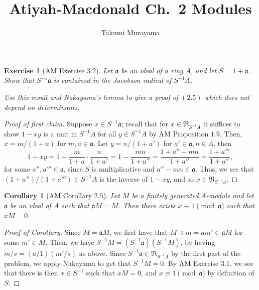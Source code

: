 \documentclass[12pt,letterpaper]{article}
\title{Atiyah-Macdonald Ch.~2 Modules}
\author{Takumi Murayama}
\newtheorem{problem}{Exercise}[section]
\newtheorem{corollary}{Corollary}
\theoremstyle{definition}
\theoremstyle{remark}
\numberwithin{figure}{problem}
\numberwithin{equation}{section}
\begin{document}
\maketitle
\setcounter{section}{3}
\begin{problem}[AM Exercise 3.2]
  Let $\mathfrak{a}$ be an ideal of a ring $A$, and let $S = 1 + \mathfrak{a}$. Show that $S^{-1}\mathfrak{a}$ is contained in the Jacobson radical of $S^{-1}A$.
  \par Use this result and Nakayama's lemma to give a proof of $(2.5)$ which does not depend on determinants.
\end{problem}
\begin{proof}[Proof of first claim]
  Suppose $x \in S^{-1}\mathfrak{a}$; recall that for $x \in \mathfrak{R}_{S^{-1}A}$ it suffices to show $1-xy$ is a unit in $S^{-1}A$ for all $y \in S^{-1}A$ by AM Proposition $1.9$. Then, $x = m/(1+a)$ for $m,a \in \mathfrak{a}$. Let $y = n/(1+a')$ for $a' \in \mathfrak{a},n \in A$, then
  \begin{equation*}
    1 - xy = 1 - \frac{m}{1+a} \cdot \frac{n}{1+a'} = 1 - \frac{mn}{1+a''} = \frac{1 + a''-mn}{1+a''} = \frac{1 + a'''}{1+a''},
  \end{equation*}
  for some $a'',a''' \in \mathfrak{a}$, since $S$ is multiplicative and $a''-mn \in \mathfrak{a}$. Thus, we see that $(1+a'')/(1+a''') \in S^{-1}A$ is the inverse of $1-xy$, and so $x \in \mathfrak{R}_{S^{-1}A}$.
\end{proof}
\begin{corollary}[AM Corollary $2.5$]
  Let $M$ be a finitely generated $A$-module and let $\mathfrak{a}$ be an ideal of $A$ such that $\mathfrak{a}M = M$. Then there exists $x \equiv 1\pmod{\mathfrak{a}}$ such that $xM = 0$.
\end{corollary}
\begin{proof}[Proof of Corollary]
  Since $M = \mathfrak{a}M$, we first have that $M \ni m = am' \in \mathfrak{a}M$ for some $m' \in M$. Then, we have $S^{-1}M = (S^{-1}\mathfrak{a})(S^{-1}M)$, by having $m/s = (a/1)(m'/s)$ as above. Since $S^{-1}\mathfrak{a} \in \mathfrak{R}_{S^{-1}A}$ by the first part of the problem, we apply Nakayama to get that $S^{-1}M = 0$. By AM Exercise $3.1$, we see that there is then $x \in S^{-1}$ such that $xM = 0$, and $x \equiv 1 \pmod{\mathfrak{a}}$ by definition of $S$.
\end{proof}
\end{document}
